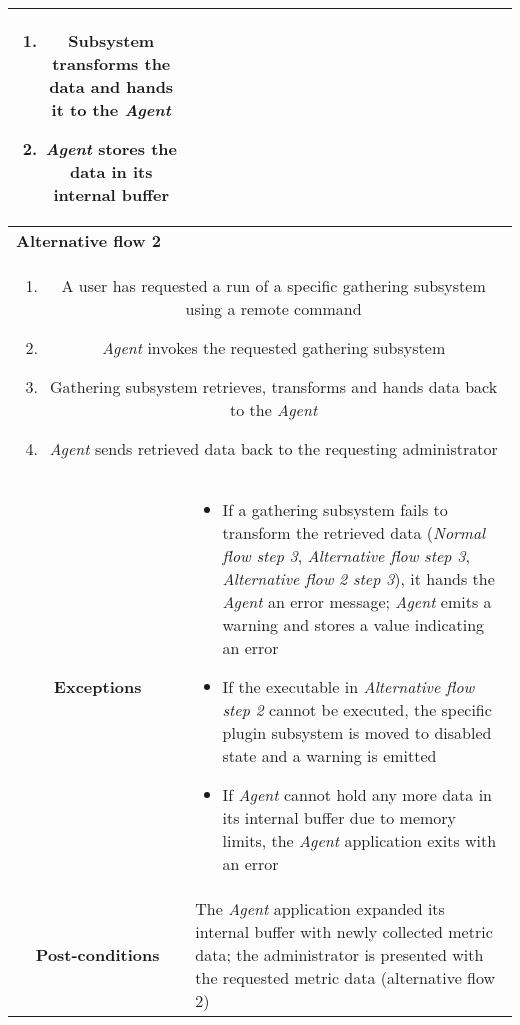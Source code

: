 \begin{longtable}{ |c|p{11.8cm}| }
{\begin{enumerate}
                        \item Subsystem transforms the data and hands it to the \textit{Agent}
                        \item \textit{Agent} stores the data in its internal buffer
                    \end{enumerate}
                }\\ \hline
                \multicolumn{2}{|l|}{\cellcolor[gray]{0.9} \textbf{Alternative flow 2}}\\ \hline
                \multicolumn{2}{|p{14cm}|}{
                    \begin{enumerate}
                        \item A user has requested a run of a specific gathering subsystem using a remote command
                        \item \textit{Agent} invokes the requested gathering subsystem
                        \item Gathering subsystem retrieves, transforms and hands data back to the \textit{Agent}
                        \item \textit{Agent} sends retrieved data back to the requesting administrator
                    \end{enumerate}
                }\\ \hline
                \cellcolor[gray]{0.9} \textbf{Exceptions} & 
                    \begin{itemize}
                        \item If a gathering subsystem fails to transform the retrieved data (\textit{Normal flow step 3}, \textit{Alternative flow step 3}, \textit{Alternative flow 2 step 3}), it hands the \textit{Agent} an error message; \textit{Agent} emits a warning and stores a value indicating an error
                        \item If the executable in \textit{Alternative flow step 2} cannot be executed, the specific plugin subsystem is moved to disabled state and a warning is emitted
                        \item If \textit{Agent} cannot hold any more data in its internal buffer due to memory limits, the \textit{Agent} application exits with an error
                    \end{itemize}\\ \hline
                \cellcolor[gray]{0.9} \textbf{Post-conditions} & The \textit{Agent} application expanded its internal buffer with newly collected metric data; the administrator is presented with the requested metric data (alternative flow 2)\\ \hline
            \end{longtable}

